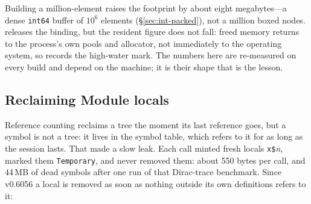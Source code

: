 Building a million-element  raises the footprint by about eight
megabytes---a dense \texttt{int64} buffer of \(10^6\) elements
(\S\ref{sec:int-packed}), not a million boxed nodes.  releases the binding,
but the resident figure does not fall: freed memory returns to the process's own pools
and allocator, not immediately to the operating system, so  records
the high-water mark. The numbers here are re-measured on every build and depend on the
machine; it is their shape that is the lesson.

\subsection*{Reclaiming Module locals}

Reference counting reclaims a tree the moment its last reference goes, but a symbol is
not a tree: it lives in the symbol table, which refers to it for as long as the session
lasts. That made  a slow leak. Each call minted fresh locals
\texttt{x\$}\textit{n}, marked them \texttt{Temporary}, and never removed them: about
550 bytes per call, and 44\,MB of dead symbols after one run of that Dirac-trace
benchmark. Since
v0.6056 a local is removed as soon as nothing outside its own definitions refers to
it:

\begin{codepairs}
\end{codepairs}

